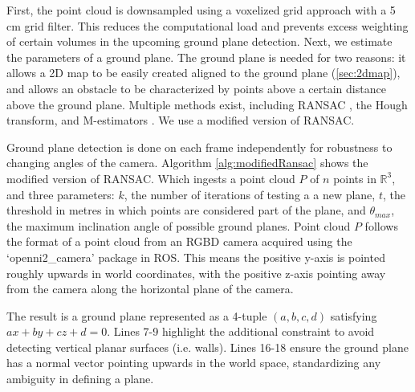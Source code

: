 
First, the point cloud is downsampled using a voxelized grid approach with a 5 cm
grid filter. This reduces the computational load and prevents excess weighting of
certain volumes in the upcoming ground plane detection.
Next, we estimate the parameters of a ground plane. 
The ground plane is needed for two reasons: it allows a 2D map to be easily
created aligned to the ground plane (\autoref{sec:2dmap}), and allows an
obstacle to be characterized by points above a certain distance above
the ground plane.
Multiple methods exist, including RANSAC \cite{fischler1981random}, the Hough
transform, and M-estimators \cite{holz2013towards}. We use a modified version
of RANSAC. 

Ground plane detection is done on each frame independently for robustness to
changing angles of the camera.
Algorithm \autoref{alg:modifiedRansac} shows the modified version of RANSAC.
Which ingests a point cloud $P$ of $n$ points in $\mathbb{R}^3$, and three
parameters: $k$, the number of iterations of testing a a new plane, $t$, the
threshold in metres in which points are considered part of the plane, and
$\theta_{max}$, the maximum inclination angle of possible ground planes.
Point cloud $P$ follows the format of a point cloud from an RGBD camera acquired
using the `openni2\_camera' package in ROS. This means the positive y-axis is
pointed roughly upwards in world coordinates, with the positive z-axis pointing
away from the camera along the horizontal plane of the camera.

The result is a ground plane represented as a 4-tuple $(a,b,c,d)$ satisfying
$ax + by + cz + d = 0$. Lines 7-9 highlight the additional constraint to avoid
detecting vertical planar surfaces (i.e. walls). Lines 16-18 ensure the ground
plane has a normal vector pointing upwards in the world space, standardizing any
ambiguity in defining a plane.


